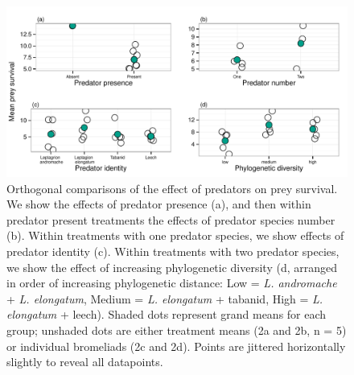\begin{figure}[htbp]
\centering
\includegraphics[width=5.5in]{figures/FIG_2.pdf}
\caption[Orthogonal comparisons of the effect of predators on
prey survival. ]{Orthogonal comparisons of the effect of predators on
prey survival. We show the effects of predator presence (a), and then
within predator present treatments the effects of predator species
number (b). Within treatments with one predator species, we show effects
of predator identity (c). Within treatments with two predator species,
we show the effect of increasing phylogenetic diversity (d, arranged in
order of increasing phylogenetic distance: Low = \emph{L. andromache} +
\emph{L. elongatum}, Medium = \emph{L. elongatum} + tabanid, High =
\emph{L. elongatum} + leech). Shaded dots represent grand means for each
group; unshaded dots are either treatment means (2a and 2b, n = 5) or
individual bromeliads (2c and 2d). Points are jittered horizontally
slightly to reveal all datapoints.}
\label{fig:ortho_pred_effect}
\end{figure}


